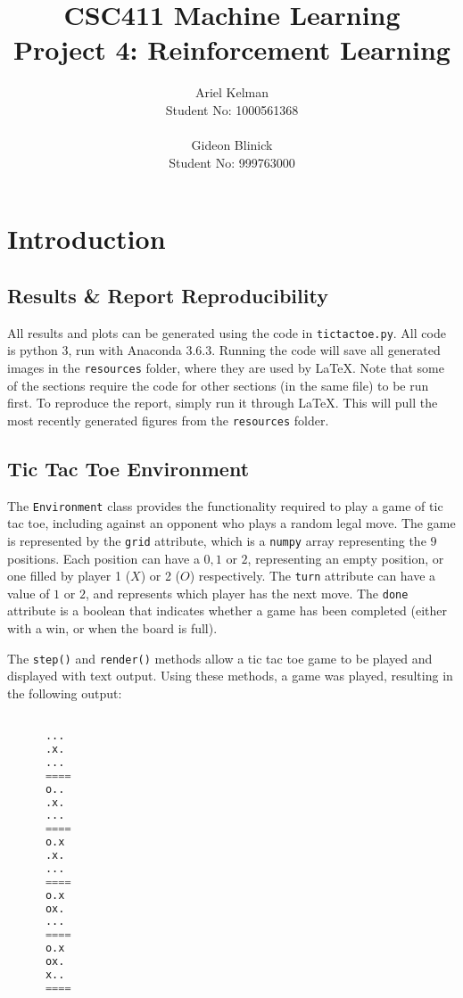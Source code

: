 \documentclass{article}
\title{CSC411 Machine Learning \\ Project 4: Reinforcement Learning}
\author{ Ariel Kelman \\ Student No: 1000561368
         \\ \\
         Gideon Blinick \\ Student No: 999763000 }
\begin{document}
   \maketitle{}


   \section{Introduction}
   \subsection{Results \& Report Reproducibility}
   All results and plots can be generated using the code in \texttt{tictactoe.py}.
   All code is python 3, run with Anaconda 3.6.3.
   Running the code will save all generated images in the \texttt{resources} folder,
   where they are used by \LaTeX. Note that some of the sections require the code for
   other sections (in the same file) to be run first.
   To reproduce the report, simply run it through \LaTeX. This will pull the most recently
   generated figures from the \texttt{resources} folder.

   \subsection{Tic Tac Toe Environment}
   The \texttt{Environment} class provides the functionality required to play a game of tic tac
   toe, including against an opponent who plays a random legal move. The game is represented by the
   \texttt{grid} attribute, which is a \texttt{numpy} array representing the $9$ positions. Each position
   can have a $0, 1$ or $2$, representing an empty position, or one filled by player 1 ($X$) or 2 ($O$)
   respectively. The \texttt{turn} attribute can have a value of $1$ or $2$, and represents which player
   has the next move. The \texttt{done} attribute is a boolean that indicates whether a game has been
   completed (either with a win, or when the board is full).

   The \texttt{step()} and \texttt{render()} methods allow a tic tac toe game to be played and displayed
   with text output. Using these methods, a game was played, resulting in the following output:
   \begin{lstlisting}[language=Python]

      ...
      .x.
      ...
      ====
      o..
      .x.
      ...
      ====
      o.x
      .x.
      ...
      ====
      o.x
      ox.
      ...
      ====
      o.x
      ox.
      x..
      ====
   \end{lstlisting}
\end{document}
